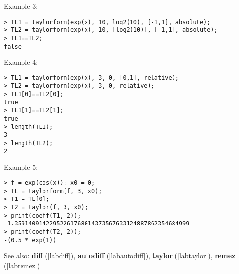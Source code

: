 \noindent Example 3: 
\begin{center}\begin{minipage}{15cm}\begin{Verbatim}[frame=single]
> TL1 = taylorform(exp(x), 10, log2(10), [-1,1], absolute);
> TL2 = taylorform(exp(x), 10, [log2(10)], [-1,1], absolute);
> TL1==TL2;
false
\end{Verbatim}
\end{minipage}\end{center}
\noindent Example 4: 
\begin{center}\begin{minipage}{15cm}\begin{Verbatim}[frame=single]
> TL1 = taylorform(exp(x), 3, 0, [0,1], relative);
> TL2 = taylorform(exp(x), 3, 0, relative);
> TL1[0]==TL2[0];
true
> TL1[1]==TL2[1];
true
> length(TL1);
3
> length(TL2);
2
\end{Verbatim}
\end{minipage}\end{center}
\noindent Example 5: 
\begin{center}\begin{minipage}{15cm}\begin{Verbatim}[frame=single]
> f = exp(cos(x)); x0 = 0;
> TL = taylorform(f, 3, x0);
> T1 = TL[0];
> T2 = taylor(f, 3, x0);
> print(coeff(T1, 2));
-1.35914091422952261768014373567633124887862354684999
> print(coeff(T2, 2));
-(0.5 * exp(1))
\end{Verbatim}
\end{minipage}\end{center}
See also: \textbf{diff} (\ref{labdiff}), \textbf{autodiff} (\ref{labautodiff}), \textbf{taylor} (\ref{labtaylor}), \textbf{remez} (\ref{labremez})
